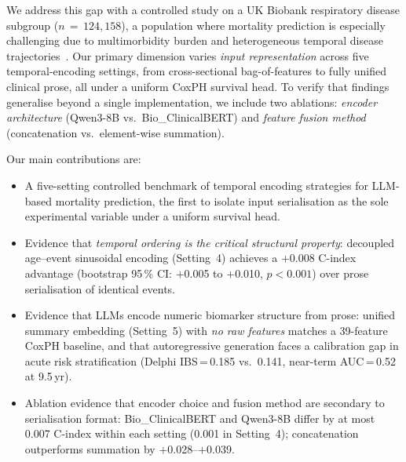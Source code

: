 We address this gap with a controlled study on a UK Biobank respiratory
disease subgroup ($n\,=\,124{,}158$), a population where mortality prediction
is especially challenging due to multimorbidity burden and heterogeneous
temporal disease trajectories~\cite{ukbmdrmf}.
Our primary dimension varies \emph{input representation} across five
temporal-encoding settings, from cross-sectional bag-of-features to fully
unified clinical prose, all under a uniform CoxPH survival head.
To verify that findings generalise beyond a single implementation, we include
two ablations: \emph{encoder architecture} (Qwen3-8B vs.\ Bio\_ClinicalBERT)
and \emph{feature fusion method} (concatenation vs.\ element-wise summation).

Our main contributions are:
\begin{itemize}
  \item A five-setting controlled benchmark of temporal encoding strategies
        for LLM-based mortality prediction, the first to isolate input
        serialisation as the sole experimental variable under a uniform
        survival head.

  \item Evidence that \emph{temporal ordering is the critical structural
        property}: decoupled age--event sinusoidal encoding (Setting~4)
        achieves a $+$0.008 C-index advantage (bootstrap 95\,\% CI:
        $+$0.005 to $+$0.010, $p<0.001$) over prose serialisation of
        identical events.

  \item Evidence that LLMs encode numeric biomarker structure from prose:
        unified summary embedding (Setting~5) with \emph{no raw features}
        matches a 39-feature CoxPH baseline, and that autoregressive
        generation faces a calibration gap in acute risk stratification
        (Delphi IBS\,=\,0.185 vs.\ 0.141, near-term AUC\,=\,0.52 at
        9.5\,yr).

  \item Ablation evidence that encoder choice and fusion method are
        secondary to serialisation format: Bio\_ClinicalBERT and Qwen3-8B
        differ by at most 0.007 C-index within each setting (0.001 in
        Setting~4); concatenation outperforms summation by
        $+$0.028--$+$0.039.
\end{itemize}
